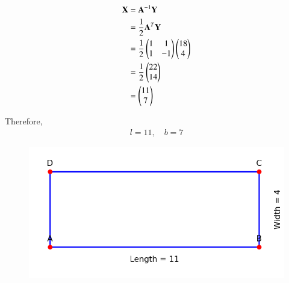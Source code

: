\documentclass[journal]{IEEEtran}
\begin{document}
\begin{align}
\mathbf{X}&= \mathbf{A}^{-1}\mathbf{Y} \\
       &= \frac{1}{2}\mathbf{A}^T \mathbf{Y} \\
       &= \frac{1}{2}\begin{pmatrix}1 & 1 \\ 1 & -1\end{pmatrix}\begin{pmatrix}18 \\ 4\end{pmatrix} \\
       &= \frac{1}{2}\begin{pmatrix}22 \\ 14\end{pmatrix} \\
       &= \begin{pmatrix}11 \\ 7\end{pmatrix}
\end{align}

Therefore,
\begin{align}
    l = 11, \quad b = 7
\end{align}

\begin{figure}[H]
\begin{center}
\includegraphics[width=0.7\columnwidth]{figs/fig.png}
\end{center}
\label{fig:Fig1}
\end{figure}
\end{document}
